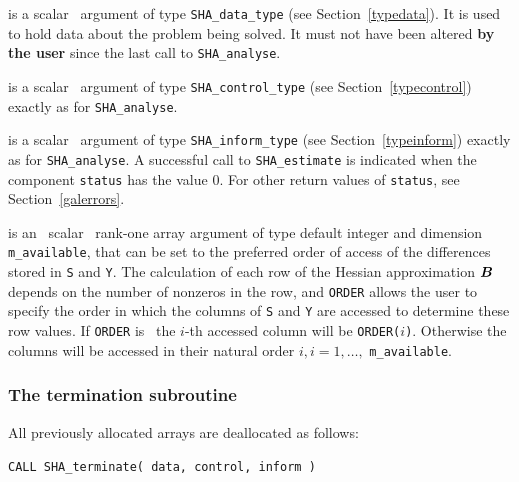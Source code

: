 \documentclass{galahad}
\newcommand{\packagename}{SHA}
\begin{document}
\begin{description}
 is a scalar \intentinout\ argument of type
{\tt \packagename\_data\_type}
(see Section~\ref{typedata}). It is used to hold data about the problem being
solved. It must not have been altered {\bf by the user} since the last call to
{\tt \packagename\_analyse}.

 is a scalar \intentin\ argument of type
{\tt \packagename\_control\_type}
(see Section~\ref{typecontrol})
exactly as for
{\tt \packagename\_analyse}.

 is a scalar \intentinout\ argument of type
{\tt \packagename\_inform\_type}
(see Section~\ref{typeinform})
exactly as for
{\tt \packagename\_analyse}.
A successful call to
{\tt \packagename\_estimate}
is indicated when the  component {\tt status} has the value 0.
For other return values of {\tt status}, see Section~\ref{galerrors}.

 is an \optional\ scalar \intentin\ rank-one array argument
of type default integer and dimension {\tt m\_available}, that can be set
to the preferred order of access of the differences stored
in {\tt S} and {\tt Y}. The calculation of each row of the
Hessian approximation ${\bm{B}}$ depends on the number of nonzeros in the row,
and {\tt ORDER} allows the user to specify the order in which the columns
of  {\tt S} and {\tt Y} are accessed to determine these row values.
If {\tt ORDER} is \present\, the $i$-th accessed column will be
{\tt ORDER(}$i${\tt )}. Otherwise the columns will be accessed
in their natural order $i, i = 1, \ldots ,$ {\tt m\_available}.

\end{description}


\subsubsection{The  termination subroutine}
All previously allocated arrays are deallocated as follows:
\vspace*{1mm}

\hspace{8mm}
{\tt CALL \packagename\_terminate( data, control, inform )}
\end{document}
